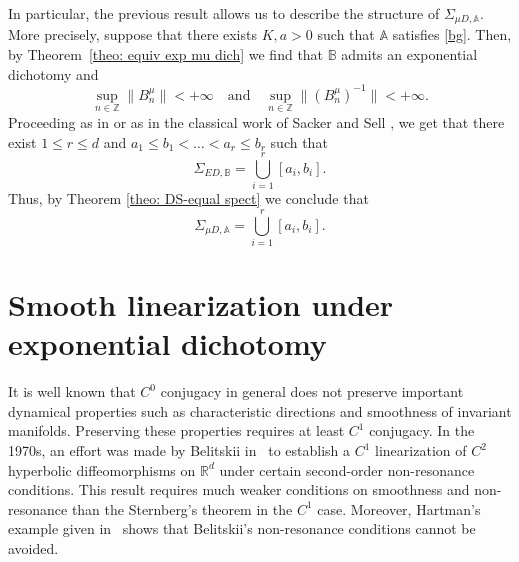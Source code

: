 \documentclass[reqno, a4paper, 10pt]{amsart}
\theoremstyle{plain}
\numberwithin{equation}{section}
\theoremstyle{remark}
\begin{document}
In particular, the previous result allows us to describe the structure of $\Sigma_{\mu D, \mathbb A}$. More precisely, suppose that there exists $K,a>0$ such that $\mathbb A$ satisfies \eqref{bg}. Then, by Theorem~\ref{theo: equiv exp mu dich} we find that $\mathbb B$ admits an exponential dichotomy and 
\begin{equation}\label{supp}
    \sup_{n\in \mathbb Z}\|B^\mu_n\|<+\infty \quad \text{and}\quad \sup_{n\in \mathbb Z}\|(B^\mu_n)^{-1}\|<+\infty. 
\end{equation}
Proceeding as in \cite[Theorem 3.4]{AS} or as in the classical work of Sacker and Sell \cite{SS-JDE78}, we get that there exist $1\le r\le d$ and $a_1\le b_1 <\ldots <a_r \le b_r$ such that
\begin{equation}\label{EDB}
\Sigma_{ED, \mathbb B}=\bigcup_{i=1}^r [a_i, b_i].
\end{equation}
Thus, by Theorem \ref{theo: DS-equal spect} we conclude that 
\begin{equation}\label{EDB-mu}
\Sigma_{\mu D, \mathbb A}=\bigcup_{i=1}^r [a_i, b_i].
\end{equation}



\section{Smooth linearization under exponential dichotomy} \label{sec: lin exp dich}


It is well known that  $C^0$ conjugacy  in general  does not preserve important dynamical properties such as  characteristic directions and  smoothness of invariant manifolds. Preserving these properties requires at least $C^1$ conjugacy. In the 1970s, an effort was made by Belitskii in~\cite{Bel73} to establish a $C^1$ linearization of $C^2$ hyperbolic diffeomorphisms on $\mathbb{R}^d$ under certain second-order non-resonance conditions. This result requires much weaker conditions on smoothness and non-resonance than the Sternberg's theorem in the $C^1$ case. Moreover, Hartman's example given in~\cite{HartPAMS60} shows that Belitskii's non-resonance conditions cannot be avoided.
\end{document}
